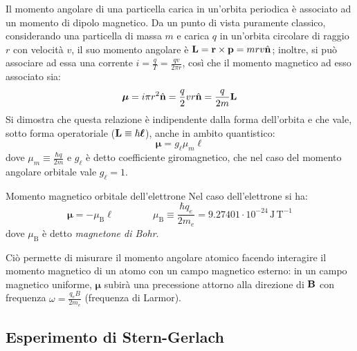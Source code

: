 Il momento angolare di una particella carica in un'orbita periodica è associato ad un momento di dipolo magnetico. Da un punto di vista puramente classico, considerando una particella di massa $ m $ e carica $ q $ in un'orbita circolare di raggio $ r $ con velocità $ v $, il suo momento angolare è $ \mathbf{L} = \mathbf{r} \times \mathbf{p} = mrv \hat{\mathbf{n}} $; inoltre, si può associare ad essa una corrente $ i = \frac{q}{T} = \frac{qv}{2\pi r} $, così che il momento magnetico ad esso associato sia:
\begin{equation*}
	\boldsymbol{\mu} = i \pi r^2 \hat{\mathbf{n}} = \frac{q}{2} vr \hat{\mathbf{n}} = \frac{q}{2m} \mathbf{L}
\end{equation*}
Si dimostra che questa relazione è indipendente dalla forma dell'orbita e che vale, sotto forma operatoriale ($ \mathbf{L} \equiv \hbar \boldsymbol{\ell} $), anche in ambito quantistico:
\begin{equation}
	\boldsymbol{\mu} = g_\ell \mu_m \boldsymbol{\ell}
	\label{eq:1.9}
\end{equation}
dove $ \mu_m \equiv \frac{\hbar q}{2m} $ e $ g_\ell $ è detto coefficiente giromagnetico, che nel caso del momento angolare orbitale vale $ g_\ell = 1 $.

\begin{example}{Momento magnetico orbitale dell'elettrone}{}
	Nel caso dell'elettrone si ha:
	\begin{equation*}
		\boldsymbol{\mu} = - \mu_\text{B} \boldsymbol{\ell}
		\qquad \qquad
		\mu_\text{B} \equiv \frac{\hbar q_e}{2m_e} = 9.27401 \cdot 10^{-24} \,\text{J}\,\text{T}^{-1}
	\end{equation*}
	dove $ \mu_\text{B} $ è detto \textit{magnetone di Bohr}.
\end{example}

Ciò permette di misurare il momento angolare atomico facendo interagire il momento magnetico di un atomo con un campo magnetico esterno: in un campo magnetico uniforme, $ \boldsymbol{\mu} $ subirà una precessione attorno alla direzione di $ \mathbf{B} $ con frequenza $ \omega = \frac{q_e B}{2m_e} $ (frequenza di Larmor).

\subsection{Esperimento di Stern-Gerlach}

